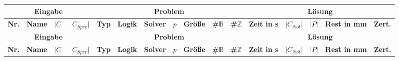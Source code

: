 \begin{landscape}
        \begin{longtable}{|c|c|c|c|c|l|c|c|c|c|c|c|c|c|c|c|}
                \hline
                \multicolumn{4}{|c|}{\textbf{Eingabe}} & \multicolumn{7}{c|}{\textbf{Problem}} & \multicolumn{5}{c|}{\textbf{Lösung}} \\
                \hline
                \textbf{Nr.} & \textbf{Name} & \textbf{$\lvert C \rvert$} & \textbf{$\lvert C_{Spec} \rvert$} & \textbf{Typ} & \textbf{Logik} & \textbf{Solver} & \textbf{$p$} & \textbf{Größe} & \textbf{\#$\mathbb{B}$} & \textbf{\#$\mathbb{Z}$} & \textbf{Zeit in s} & \textbf{$\lvert C_{Not} \rvert$} & \textbf{$\lvert P \rvert$} & \textbf{Rest in mm} & \textbf{Zert.} \\
                \hline
                \endfirsthead

                \hline
                \multicolumn{4}{|c|}{\textbf{Eingabe}} & \multicolumn{7}{c|}{\textbf{Problem}} & \multicolumn{5}{c|}{\textbf{Lösung}} \\
                \hline
                \textbf{Nr.} & \textbf{Name} & \textbf{$\lvert C \rvert$} & \textbf{$\lvert C_{Spec} \rvert$} & \textbf{Typ} & \textbf{Logik} & \textbf{Solver} & \textbf{$p$} & \textbf{Größe} & \textbf{\#$\mathbb{B}$} & \textbf{\#$\mathbb{Z}$} & \textbf{Zeit in s} & \textbf{$\lvert C_{Not} \rvert$} & \textbf{$\lvert P \rvert$} & \textbf{Rest in mm} & \textbf{Zert.} \\
                \hline
                \endhead


\end{longtable}
\end{landscape}
